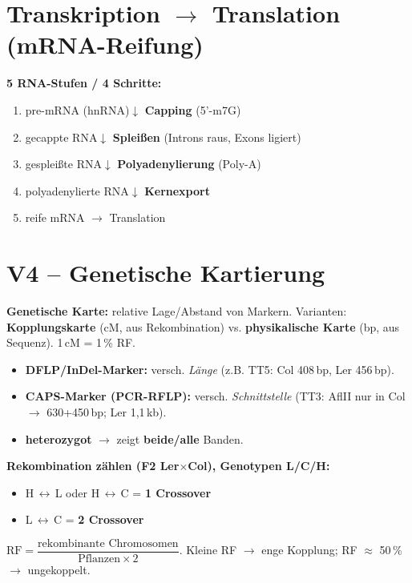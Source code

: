 

\section{Transkription $\to$ Translation (mRNA-Reifung)}
\textbf{5 RNA-Stufen / 4 Schritte:}
\begin{enumerate}
    \item pre-mRNA (hnRNA)\quad$\downarrow$ \textbf{Capping} (5'-m7G)
    \item gecappte RNA\quad$\downarrow$ \textbf{Spleißen} (Introns raus, Exons ligiert)
    \item gespleißte RNA\quad$\downarrow$ \textbf{Polyadenylierung} (Poly-A)
    \item polyadenylierte RNA\quad$\downarrow$ \textbf{Kernexport}
    \item reife mRNA $\to$ Translation
\end{enumerate}




\section{V4 -- Genetische Kartierung}
\textbf{Genetische Karte:} relative Lage/Abstand von Markern. Varianten: \textbf{Kopplungskarte} (cM, aus Rekombination) vs. \textbf{physikalische Karte} (bp, aus Sequenz). 1\,cM = 1\,\% RF.
\begin{itemize}
    \item \textbf{DFLP/InDel-Marker:} versch. \emph{Länge} (z.B. TT5: Col 408\,bp, Ler 456\,bp).
    \item \textbf{CAPS-Marker (PCR-RFLP):} versch. \emph{Schnittstelle} (TT3: AflII nur in Col $\to$ 630+450\,bp; Ler 1,1\,kb).
    \item \textbf{heterozygot} $\to$ zeigt \textbf{beide/alle} Banden.
\end{itemize}
\textbf{Rekombination zählen (F2 Ler$\times$Col), Genotypen L/C/H:}
\begin{itemize}
    \item H\,$\leftrightarrow$\,L oder H\,$\leftrightarrow$\,C = \textbf{1 Crossover}
    \item L\,$\leftrightarrow$\,C = \textbf{2 Crossover}
\end{itemize}
$\text{RF} = \dfrac{\text{rekombinante Chromosomen}}{\text{Pflanzen}\times 2}$.\;
Kleine RF $\to$ enge Kopplung; RF $\approx$ 50\,\% $\to$ ungekoppelt.



